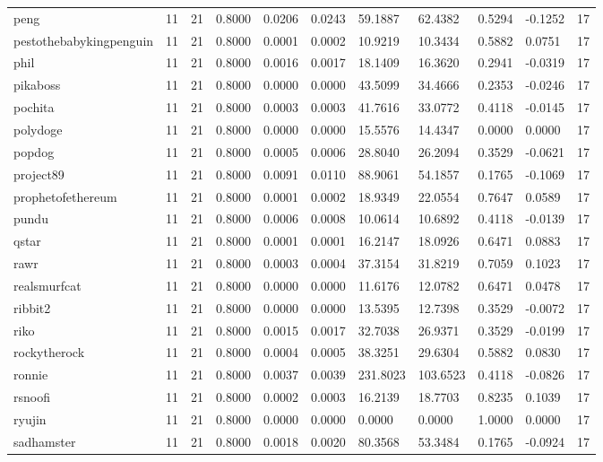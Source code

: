 \begin{table}[htbp]
\begin{tabular}{lllllllllll}
peng & 11 & 21 & 0.8000 & 0.0206 & 0.0243 & 59.1887 & 62.4382 & 0.5294 & -0.1252 & 17 \\
pestothebabykingpenguin & 11 & 21 & 0.8000 & 0.0001 & 0.0002 & 10.9219 & 10.3434 & 0.5882 & 0.0751 & 17 \\
phil & 11 & 21 & 0.8000 & 0.0016 & 0.0017 & 18.1409 & 16.3620 & 0.2941 & -0.0319 & 17 \\
pikaboss & 11 & 21 & 0.8000 & 0.0000 & 0.0000 & 43.5099 & 34.4666 & 0.2353 & -0.0246 & 17 \\
pochita & 11 & 21 & 0.8000 & 0.0003 & 0.0003 & 41.7616 & 33.0772 & 0.4118 & -0.0145 & 17 \\
polydoge & 11 & 21 & 0.8000 & 0.0000 & 0.0000 & 15.5576 & 14.4347 & 0.0000 & 0.0000 & 17 \\
popdog & 11 & 21 & 0.8000 & 0.0005 & 0.0006 & 28.8040 & 26.2094 & 0.3529 & -0.0621 & 17 \\
project89 & 11 & 21 & 0.8000 & 0.0091 & 0.0110 & 88.9061 & 54.1857 & 0.1765 & -0.1069 & 17 \\
prophetofethereum & 11 & 21 & 0.8000 & 0.0001 & 0.0002 & 18.9349 & 22.0554 & 0.7647 & 0.0589 & 17 \\
pundu & 11 & 21 & 0.8000 & 0.0006 & 0.0008 & 10.0614 & 10.6892 & 0.4118 & -0.0139 & 17 \\
qstar & 11 & 21 & 0.8000 & 0.0001 & 0.0001 & 16.2147 & 18.0926 & 0.6471 & 0.0883 & 17 \\
rawr & 11 & 21 & 0.8000 & 0.0003 & 0.0004 & 37.3154 & 31.8219 & 0.7059 & 0.1023 & 17 \\
realsmurfcat & 11 & 21 & 0.8000 & 0.0000 & 0.0000 & 11.6176 & 12.0782 & 0.6471 & 0.0478 & 17 \\
ribbit2 & 11 & 21 & 0.8000 & 0.0000 & 0.0000 & 13.5395 & 12.7398 & 0.3529 & -0.0072 & 17 \\
riko & 11 & 21 & 0.8000 & 0.0015 & 0.0017 & 32.7038 & 26.9371 & 0.3529 & -0.0199 & 17 \\
rockytherock & 11 & 21 & 0.8000 & 0.0004 & 0.0005 & 38.3251 & 29.6304 & 0.5882 & 0.0830 & 17 \\
ronnie & 11 & 21 & 0.8000 & 0.0037 & 0.0039 & 231.8023 & 103.6523 & 0.4118 & -0.0826 & 17 \\
rsnoofi & 11 & 21 & 0.8000 & 0.0002 & 0.0003 & 16.2139 & 18.7703 & 0.8235 & 0.1039 & 17 \\
ryujin & 11 & 21 & 0.8000 & 0.0000 & 0.0000 & 0.0000 & 0.0000 & 1.0000 & 0.0000 & 17 \\
sadhamster & 11 & 21 & 0.8000 & 0.0018 & 0.0020 & 80.3568 & 53.3484 & 0.1765 & -0.0924 & 17 \\

\end{tabular}
\end{table}
